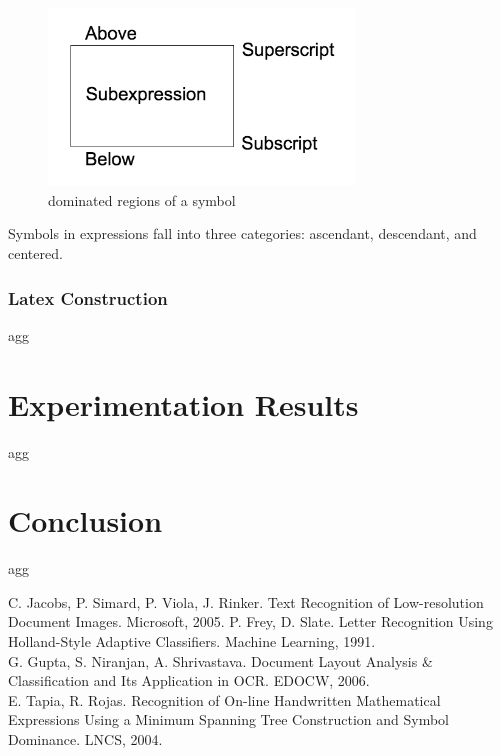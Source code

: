\documentclass[12pt]{IEEEtran}
\begin{document}
\begin{figure}[h]
  \centering
    \includegraphics[width=3.2in]{locations.png}
  \caption{dominated regions of a symbol}
  \label{fig:locations}
\end{figure}

Symbols in expressions fall into three categories: ascendant, descendant, and centered.




\subsubsection{Latex Construction}

agg

\section{Experimentation Results}

agg

\section{Conclusion}

agg

\begin{thebibliography}{1}
 C. Jacobs, P. Simard, P. Viola, J. Rinker. Text Recognition of Low-resolution Document Images. Microsoft, 2005.
 P. Frey, D. Slate. Letter Recognition Using Holland-Style
Adaptive Classifiers. Machine Learning, 1991. \\
 G. Gupta, S. Niranjan, A. Shrivastava. Document Layout Analysis \& Classification and Its Application in OCR. EDOCW, 2006. \\
 E. Tapia, R. Rojas. Recognition of On-line Handwritten Mathematical Expressions Using a Minimum Spanning Tree Construction and Symbol Dominance. LNCS, 2004.
\end{thebibliography}

\end{document}
